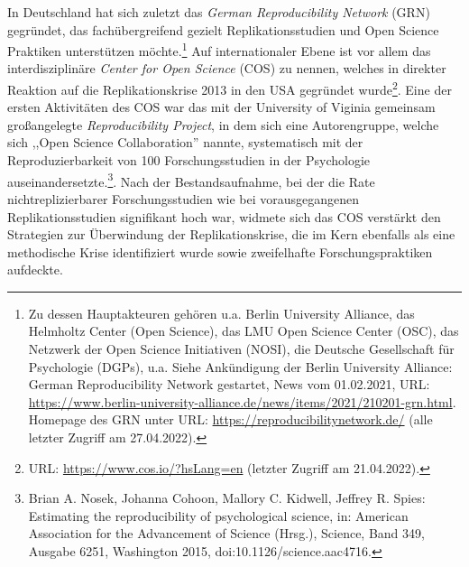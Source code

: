 In Deutschland hat sich zuletzt das \textit{German Reproducibility Network} (GRN) gegründet, das fachübergreifend gezielt Replikationsstudien und Open Science Praktiken unterstützen möchte.\footnote{Zu dessen Hauptakteuren gehören u.a. Berlin University Alliance, das Helmholtz Center (Open Science), das LMU Open Science Center (OSC), das Netzwerk der Open Science Initiativen (NOSI), die Deutsche Gesellschaft für Psychologie (DGPs), u.a. Siehe Ankündigung der Berlin University Alliance: German Reproducibility Network gestartet, News vom 01.02.2021, URL: \url{https://www.berlin-university-alliance.de/news/items/2021/210201-grn.html}. Homepage des GRN unter URL: \url{https://reproducibilitynetwork.de/} (alle letzter Zugriff am 27.04.2022).} Auf internationaler Ebene ist vor allem das interdisziplinäre \textit{Center for Open Science} (COS) zu nennen, welches in direkter Reaktion auf die Replikationskrise 2013 in den USA gegründet wurde\footnote{URL: \url{https://www.cos.io/?hsLang=en} (letzter Zugriff am 21.04.2022).}. Eine der ersten Aktivitäten des COS war das mit der University of Viginia gemeinsam großangelegte \textit{Reproducibility Project}, in dem sich eine Autorengruppe, welche sich ,,Open Science Collaboration'' nannte, systematisch mit der Reproduzierbarkeit von 100 Forschungsstudien in der Psychologie auseinandersetzte.\footnote{Brian A. Nosek, Johanna Cohoon, Mallory C. Kidwell, Jeffrey R. Spies: Estimating the reproducibility of psychological science, in: American Association for the Advancement of Science (Hrsg.), Science, Band 349, Ausgabe 6251, Washington 2015, doi:10.1126/science.aac4716.}. Nach der Bestandsaufnahme, bei der die Rate nichtreplizierbarer Forschungsstudien wie bei vorausgegangenen Replikationsstudien signifikant hoch war, widmete sich das COS verstärkt den Strategien zur Überwindung der Replikationskrise, die im Kern ebenfalls als eine methodische Krise identifiziert wurde sowie zweifelhafte Forschungspraktiken aufdeckte.

